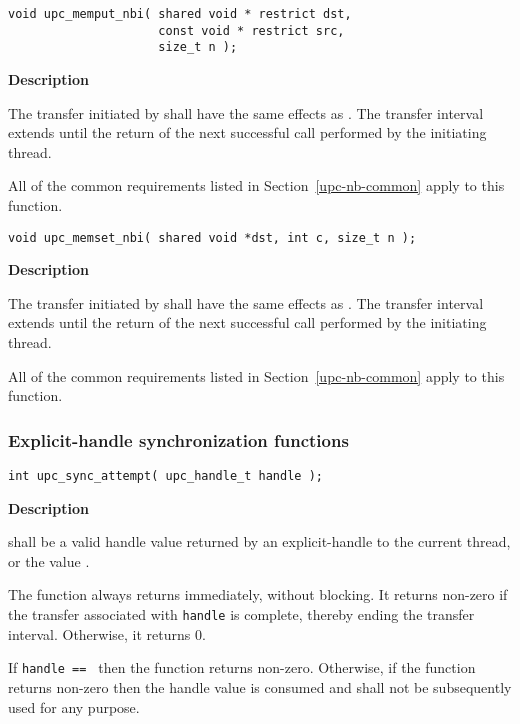 \def\bfunc{upc\_memput\_nbi}
\def\sfunc{\memput}
\funcheader

\begin{verbatim}
void upc_memput_nbi( shared void * restrict dst, 
                     const void * restrict src, 
                     size_t n );
\end{verbatim}

{\bf Description}

\np The transfer initiated by \func\args shall have the same effects as \sfunc\args.
The transfer interval extends until the return of the next successful 
\synci call performed by the initiating thread.

\np All of the common requirements listed in Section~\ref{upc-nb-common} apply to this function.

\newpage
\def\bfunc{upc\_memset\_nbi}
\def\sfunc{\memset}
\funcheader

\begin{verbatim}
void upc_memset_nbi( shared void *dst, int c, size_t n );
\end{verbatim}

{\bf Description}

\np The transfer initiated by \func\sargs shall have the same effects as \sfunc\sargs.
The transfer interval extends until the return of the next successful 
\synci call performed by the initiating thread.

\np All of the common requirements listed in Section~\ref{upc-nb-common} apply to this function.

\newpage
\subsubsection{Explicit-handle synchronization functions}
\def\bfunc{upc\_sync\_attempt}
\funcheader

\begin{verbatim}
int upc_sync_attempt( upc_handle_t handle ); 
\end{verbatim}

{\bf Description}

 shall be a valid handle value returned by
an explicit-handle \TIF to the current thread, or the value \complete.

\np The \func function always returns immediately, without blocking.
It returns non-zero if the transfer associated with 
{\tt handle} is complete, thereby ending the transfer interval.
Otherwise, it returns 0.

\np If {\tt handle == \complete} then the \func function returns non-zero.
Otherwise, if the function returns non-zero then the handle value is consumed 
and shall not be subsequently used for any purpose.

